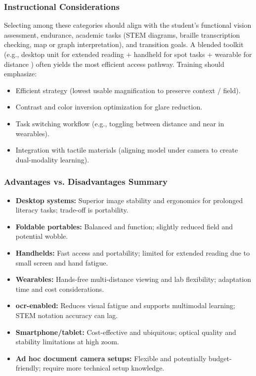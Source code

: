 \subsubsection*{Instructional Considerations}
Selecting among these categories should align with the student's functional vision assessment, endurance, academic tasks (STEM diagrams, braille transcription checking, map or graph interpretation), and transition goals. A blended toolkit (e.g., desktop unit for extended reading + handheld for spot tasks + wearable for distance ) often yields the most efficient access pathway.\supercite{Legge1987ReadingIII, ReadingContrastLowVisionEvidence, HighAddNearDeviceGuidelines, OpticalVsElectronicMagnificationReview} Training should emphasize:
\begin{itemize}
	\item Efficient  strategy (lowest usable magnification to preserve context / field).
	\item Contrast and color inversion optimization for glare reduction.
	\item Task switching workflow (e.g., toggling between distance and near in wearables).
	\item Integration with tactile materials (aligning model under camera to create dual-modality learning).
\end{itemize}

\subsubsection*{Advantages vs. Disadvantages Summary}
\begin{itemize}
	\item \textbf{Desktop systems:} Superior image stability and ergonomics for prolonged literacy tasks; trade-off is portability.
	\item \textbf{Foldable portables:} Balanced  and function; slightly reduced field and potential wobble.
	\item \textbf{Handhelds:} Fast access and portability; limited for extended reading due to small screen and hand fatigue.
	\item \textbf{Wearables:} Hands-free multi-distance viewing and lab flexibility; adaptation time and cost considerations.
	\item \textbf{\gls{ocr}-enabled:} Reduces visual fatigue and supports multimodal learning; STEM notation accuracy can lag.
	\item \textbf{Smartphone/tablet:} Cost-effective and ubiquitous; optical quality and stability limitations at high zoom.
	\item \textbf{Ad hoc document camera setups:} Flexible and potentially budget-friendly; require more technical setup knowledge.
\end{itemize}


